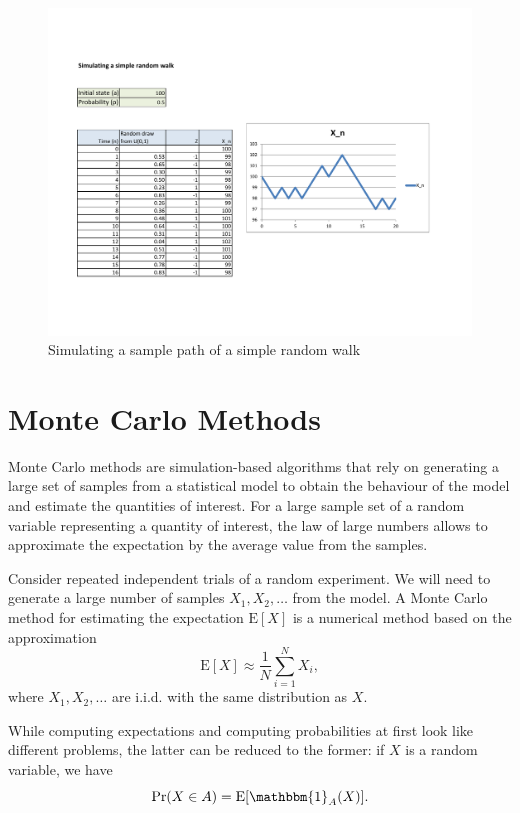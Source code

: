 \documentclass[
]{book}
\theoremstyle{definition}
\theoremstyle{definition}
\theoremstyle{definition}
\theoremstyle{definition}
\theoremstyle{remark}
\begin{document}
\begin{figure}
\hypertarget{fig:RW}{%
\centering
\includegraphics[width=8in,height=\textheight]{RW.pdf}
\caption{Simulating a sample path of a simple random walk}\label{fig:RW}
}
\end{figure}

\hypertarget{monte-carlo-methods}{%
\section{Monte Carlo Methods}\label{monte-carlo-methods}}

Monte Carlo methods are simulation-based algorithms that rely on
generating a large set of samples from a statistical model to obtain the
behaviour of the model and estimate the quantities of interest. For a
large sample set of a random variable representing a quantity of
interest, the law of large numbers allows to approximate the expectation
by the average value from the samples.

Consider repeated independent trials of a random experiment. We will
need to generate a large number of samples \(X_1, X_2, \ldots\) from the
model. A Monte Carlo method for estimating the expectation
\(\mathrm{E}[ X ]\) is a numerical method based on the approximation
\[\mathrm{E}[ X] \approx \frac{1}{N}\sum_{i=1}^N X_i,\] where
\(X_1, X_2, \ldots\) are i.i.d. with the same distribution as \(X\).

While computing expectations and computing probabilities at first look
like different problems, the latter can be reduced to the former: if \(X\)
is a random variable, we have
\[\Pr(X \in A) = \mathrm{E}[\mathbbm{1}_A(X)].\]
\end{document}
